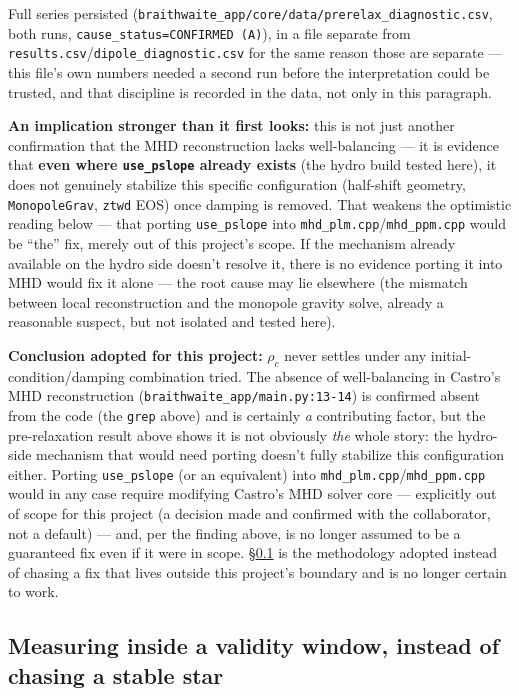 \documentclass[11pt,a4paper]{scrartcl}
\newcommand{\code}[1]{\texttt{\small #1}}
\begin{document}
Full series persisted
(\code{braithwaite\_app/core/data/prerelax\_diagnostic.csv}, both runs,
\code{cause\_status=CONFIRMED (A)}), in a file separate from
\code{results.csv}/\code{dipole\_diagnostic.csv} for the same reason
those are separate --- this file's own numbers needed a second run
before the interpretation could be trusted, and that discipline is
recorded in the data, not only in this paragraph.

\textbf{An implication stronger than it first looks:} this is not just
another confirmation that the MHD reconstruction lacks well-balancing
--- it is evidence that \textbf{even where \code{use\_pslope} already
exists} (the hydro build tested here), it does not genuinely stabilize
this specific configuration (half-shift geometry, \code{MonopoleGrav},
\code{ztwd} EOS) once damping is removed. That weakens the optimistic
reading below --- that porting \code{use\_pslope} into
\code{mhd\_plm.cpp}/\code{mhd\_ppm.cpp} would be ``the'' fix, merely
out of this project's scope. If the mechanism already available on the
hydro side doesn't resolve it, there is no evidence porting it into
MHD would fix it alone --- the root cause may lie elsewhere (the
mismatch between local reconstruction and the monopole gravity solve,
already a reasonable suspect, but not isolated and tested here).

\textbf{Conclusion adopted for this project:} $\rho_c$ never settles
under any initial-condition/damping combination tried. The absence of
well-balancing in Castro's MHD reconstruction
(\code{braithwaite\_app/main.py:13-14}) is confirmed absent from the
code (the \code{grep} above) and is certainly \emph{a} contributing
factor, but the pre-relaxation result above shows it is not obviously
\emph{the} whole story: the hydro-side mechanism that would need
porting doesn't fully stabilize this configuration either. Porting
\code{use\_pslope} (or an equivalent) into
\code{mhd\_plm.cpp}/\code{mhd\_ppm.cpp} would in any case require
modifying Castro's MHD solver core --- explicitly out of scope for this
project (a decision made and confirmed with the collaborator, not a
default) --- and, per the finding above, is no longer assumed to be a
guaranteed fix even if it were in scope. \S\ref{sec:validity-window} is
the methodology adopted instead of chasing a fix that lives outside
this project's boundary and is no longer certain to work.

\subsection{Measuring inside a validity window, instead of chasing a stable star}
\label{sec:validity-window}
\end{document}
